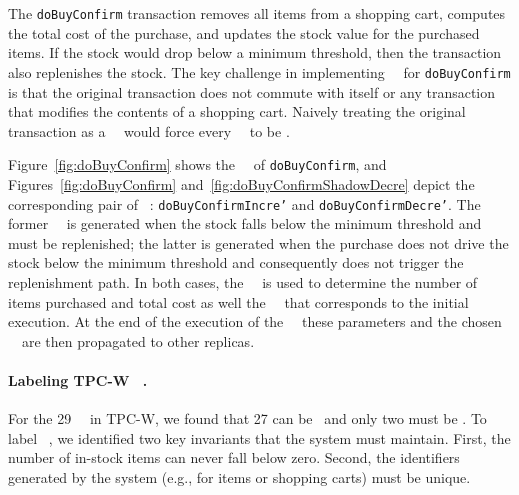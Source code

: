 


The {\tt doBuyConfirm} transaction removes all items from a shopping cart,
computes the total cost of the purchase, and updates the stock value
for the purchased items.  If the stock would drop below a minimum
threshold, then the transaction also replenishes the stock.  The key
challenge in implementing \shadow\ \transactions\ for {\tt doBuyCo\-nfirm} is
that the original transaction does not commute with itself or any
transaction that modifies the contents of a shopping cart.  Naively
treating the original transaction as a \shadow\ \operation\ would force
every \shadow\ \operation\ to be \red. 

Figure~\ref{fig:doBuyConfirm} shows the \initial\ \operation\ of {\tt doBuyConfirm}, and Figures~\ref{fig:doBuyConfirm} and~\ref{fig:doBuyConfirmShadowDecre} depict the corresponding pair of \shadow\ \operations: {\tt doBuyConfirmIncre'} and {\tt doBuyConfirmDecre'}. The former \shadow\ \operation\ is generated when the stock falls below the minimum
threshold and must be replenished; the latter is generated
when the purchase does not drive the stock below
the minimum threshold and consequently does not trigger the
replenishment path.  In both cases, the 
\initial\ \operation\ is used to determine the number of items purchased
and total cost as well the \shadow\ \operation\ that corresponds to the
initial execution. At the end of the execution of the \initial\ \operation\, these parameters and the chosen \shadow\ \operation\ are then propagated to other replicas.

\paragraph{Labeling TPC-W \shadow\ \transactions.}
For the 29 \shadow\ \transactions\ in TPC-W, we found that 27 can be \blue\ and only two
must be \red. To label \shadow\ \transactions, we identified two key invariants that the
system must maintain. First, the number of in-stock items can never
fall below zero.  Second, the identifiers generated by the system
(e.g., for items or shopping carts) must be unique.


